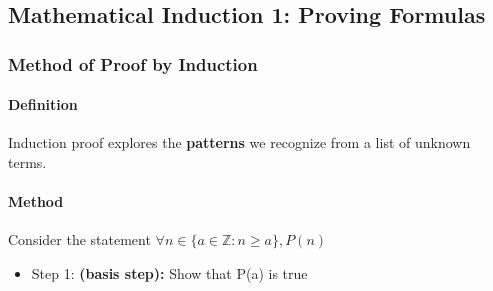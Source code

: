 \subsection{Mathematical Induction 1: Proving Formulas}
\hrulefill

\subsubsection*{Method of Proof by Induction}
\paragraph*{Definition}
Induction proof explores the \textbf{patterns} we recognize from a list of unknown terms.

\paragraph*{Method}
Consider the statement $\forall n \in \{a \in \mathbb{Z} : n \geq a\}, P(n)$
\begin{itemize}
    \item Step 1: \textbf{(basis step):} Show that P(a) is true
\end{itemize}